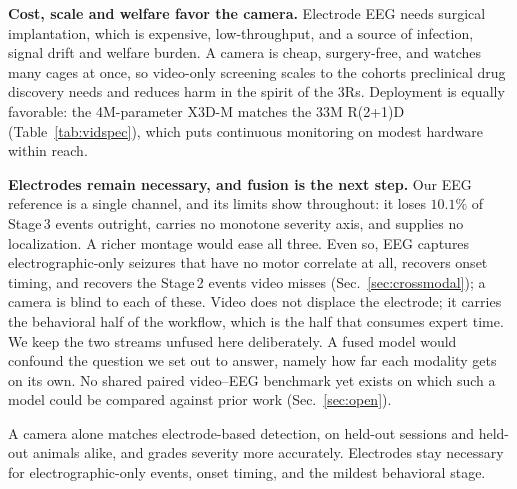 \noindent\textbf{Cost, scale and welfare favor the camera.}
Electrode EEG needs surgical implantation, which is expensive, low-throughput, and a
source of infection, signal drift and welfare burden. A camera is cheap,
surgery-free, and watches many cages at once, so video-only screening scales to the
cohorts preclinical drug discovery needs and reduces harm in the spirit of the 3Rs.
Deployment is equally favorable: the 4M-parameter X3D-M matches the 33M R(2+1)D
(Table~\ref{tab:vidspec}), which puts continuous monitoring on modest hardware
within reach.

\noindent\textbf{Electrodes remain necessary, and fusion is the next step.}
Our EEG reference is a single channel, and its limits show throughout: it loses
$10.1\%$ of Stage\,3 events outright, carries no monotone severity axis, and
supplies no localization. A richer montage would ease all three. Even so, EEG
captures electrographic-only seizures that have no motor correlate at all, recovers
onset timing, and recovers the Stage\,2 events video misses
(Sec.~\ref{sec:crossmodal}); a camera is blind to each of these. Video does not
displace the electrode; it carries the behavioral half of the workflow, which is the
half that consumes expert time. We keep the two streams unfused here deliberately.
A fused model would confound the question we set out to answer, namely how far each modality gets on its own. No shared paired video--EEG benchmark yet exists on which such a model could be compared against prior work (Sec.~\ref{sec:open}).

\begin{takeaway}
\takeawaylabel A camera alone matches electrode-based detection, on held-out
sessions and held-out animals alike, and grades severity more accurately.
Electrodes stay necessary for electrographic-only events, onset timing, and the
mildest behavioral stage.
\end{takeaway}

